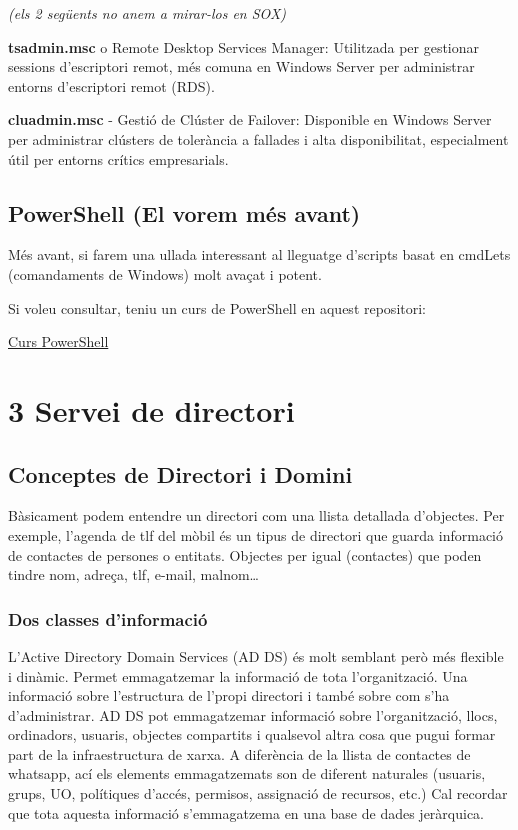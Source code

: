 \documentclass[
  a4paper,
]{article}
\begin{document}
\emph{(els 2 següents no anem a mirar-los en SOX)}

\textbf{tsadmin.msc} o Remote Desktop Services Manager: Utilitzada per
gestionar sessions d'escriptori remot, més comuna en Windows Server per
administrar entorns d'escriptori remot (RDS).

\textbf{cluadmin.msc} - Gestió de Clúster de Failover: Disponible en
Windows Server per administrar clústers de tolerància a fallades i alta
disponibilitat, especialment útil per entorns crítics empresarials.

\subsection{PowerShell (El vorem més
avant)}\label{powershell-el-vorem-muxe9s-avant}

Més avant, si farem una ullada interessant al lleguatge d'scripts basat
en cmdLets (comandaments de Windows) molt avaçat i potent.

Si voleu consultar, teniu un curs de PowerShell en aquest repositori:

\href{https://github.com/tofermos/PowerShell}{Curs PowerShell}

\section{3 Servei de directori}\label{servei-de-directori}

\subsection{Conceptes de Directori i
Domini}\label{conceptes-de-directori-i-domini}

Bàsicament podem entendre un directori com una llista detallada
d'objectes. Per exemple, l'agenda de tlf del mòbil és un tipus de
directori que guarda informació de contactes de persones o entitats.
Objectes per igual (contactes) que poden tindre nom, adreça, tlf,
e-mail, malnom\ldots{}

\subsubsection{Dos classes
d'informació}\label{dos-classes-dinformaciuxf3}

L'Active Directory Domain Services (AD DS) és molt semblant però més
flexible i dinàmic. Permet emmagatzemar la informació de tota
l'organització. Una informació sobre l'estructura de l'propi directori i
també sobre com s'ha d'administrar. AD DS pot emmagatzemar informació
sobre l'organització, llocs, ordinadors, usuaris, objectes compartits i
qualsevol altra cosa que pugui formar part de la infraestructura de
xarxa. A diferència de la llista de contactes de whatsapp, ací els
elements emmagatzemats son de diferent naturales (usuaris, grups, UO,
polítiques d'accés, permisos, assignació de recursos, etc.) Cal recordar
que tota aquesta informació s'emmagatzema en una base de dades
jeràrquica.
\end{document}
